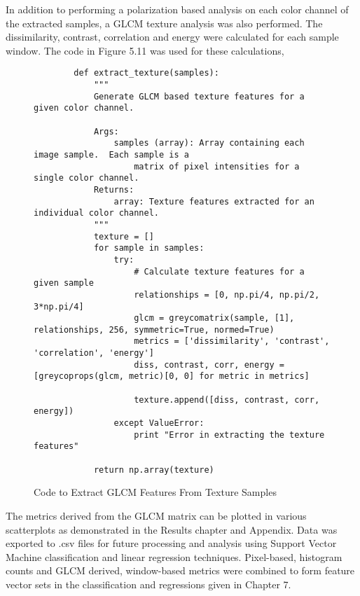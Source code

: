 In addition to performing a polarization based analysis on each color channel of the extracted samples, a GLCM texture analysis was also performed.  The dissimilarity, contrast, correlation and energy were calculated for each sample window.  The code in Figure 5.11 was used for these calculations,
\begin{figure}
    \begin{lstlisting}
        def extract_texture(samples):
            """
            Generate GLCM based texture features for a given color channel.

            Args:
                samples (array): Array containing each image sample.  Each sample is a
                    matrix of pixel intensities for a single color channel.
            Returns:
                array: Texture features extracted for an individual color channel.
            """
            texture = []
            for sample in samples:
                try:
                    # Calculate texture features for a given sample
                    relationships = [0, np.pi/4, np.pi/2, 3*np.pi/4]
                    glcm = greycomatrix(sample, [1], relationships, 256, symmetric=True, normed=True)
                    metrics = ['dissimilarity', 'contrast', 'correlation', 'energy']
                    diss, contrast, corr, energy = [greycoprops(glcm, metric)[0, 0] for metric in metrics]

                    texture.append([diss, contrast, corr, energy])
                except ValueError:
                    print "Error in extracting the texture features"

            return np.array(texture)
    \end{lstlisting}
    \caption{Code to Extract GLCM Features From Texture Samples}
    \label{fig:scattering}
\end{figure}
The metrics derived from the GLCM matrix can be plotted in various scatterplots as demonstrated in the Results chapter and Appendix. Data was exported to .csv files for future processing and analysis using Support Vector Machine classification and linear regression techniques.
Pixel-based, histogram counts and GLCM derived, window-based metrics were combined to form feature vector sets in the classification and regressions given in Chapter 7.
